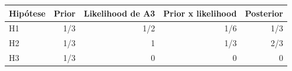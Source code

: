 \begin{tabular}{lrrrr}
\toprule
Hipótese & Prior & Likelihood de A3 & Prior x likelihood & Posterior \\
\midrule
H1 & 1/3 & 1/2 & 1/6 & 1/3 \\
H2 & 1/3 & 1 & 1/3 & 2/3 \\
H3 & 1/3 & 0 & 0 & 0 \\
\bottomrule
\end{tabular}
